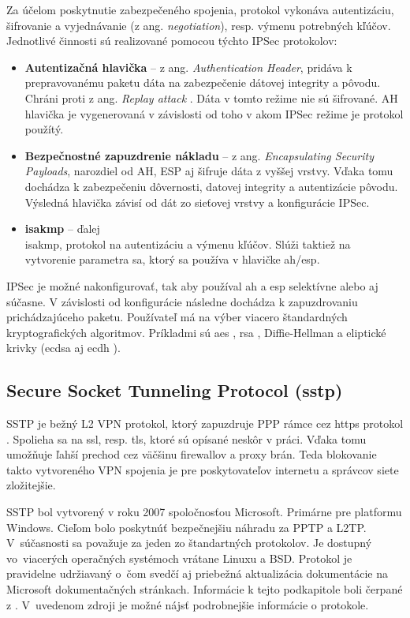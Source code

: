 Za účelom poskytnutie zabezpečeného spojenia, protokol vykonáva autentizáciu, šifrovanie a vyjednávanie (z ang. \textit{negotiation}), resp. výmenu potrebných kľúčov. Jednotlivé činnosti sú realizované pomocou týchto IPSec protokolov:
\begin{itemize}
	\item{\textbf{Autentizačná hlavička}} -- z ang. \textit{Authentication Header}, pridáva k prepravovanému paketu dáta na zabezpečenie dátovej integrity a pôvodu. Chráni proti z ang. \textit{Replay attack} \cite{repa}. Dáta v tomto režime nie sú šifrované. AH hlavička je vygenerovaná v závislosti od toho v akom IPSec režime je protokol použítý.    
	\item{\textbf{Bezpečnostné zapuzdrenie nákladu}} -- z ang. \textit{Encapsulating Security Payloads}, narozdiel od AH, ESP aj šifruje dáta z vyššej vrstvy. Vďaka tomu dochádza k zabezpečeniu dôvernosti, datovej integrity a autentizácie pôvodu. Výsledná hlavička závisí od dát zo sieťovej vrstvy a konfigurácie IPSec.    
	\item{\textbf{\acrlong{isakmp}}} -- ďalej \\\acrshort{isakmp}, protokol na autentizáciu a výmenu kľúčov. Slúži taktiež na vytvorenie parametra \acrshort{sa}, ktorý sa používa v hlavičke \acrshort{ah}/\acrshort{esp}.
\end{itemize}

IPSec je možné nakonfigurovať, tak aby používal \acrshort{ah} a \acrshort{esp} selektívne alebo aj súčasne. V závislosti od konfigurácie následne dochádza k zapuzdrovaniu prichádzajúceho paketu. Používateľ má na výber viacero štandardných kryptografických algoritmov. Príkladmi sú \acrshort{aes} \cite{aes}, \acrshort{rsa} \cite{rsa}, Diffie-Hellman \cite{dh} a  eliptické krivky (\acrshort{ecdsa} \cite{ecdsa} aj \acrshort{ecdh} \cite{ecdh}).

\subsection{Secure Socket Tunneling Protocol (\acrshort{sstp})}
SSTP je bežný L2 VPN protokol, ktorý zapuzdruje PPP rámce cez \acrshort{https} protokol \cite{https}. Spolieha sa na \acrshort{ssl}, resp. \acrshort{tls}, ktoré sú opísané neskôr v práci. Vďaka tomu umožňuje ľahší prechod cez väčšinu firewallov a proxy brán. Teda blokovanie takto vytvoreného VPN spojenia je pre poskytovateľov internetu a správcov siete zložitejšie. 

SSTP bol vytvorený v roku 2007 spoločnosťou Microsoft. Primárne pre platformu Windows. Cieľom bolo poskytnúť bezpečnejšiu náhradu za PPTP a L2TP. V~súčasnosti sa považuje za jeden zo štandartných protokolov. Je dostupný vo~viacerých operačných systémoch vrátane Linuxu a BSD. Protokol je pravidelne udržiavaný o~čom svedčí aj priebežná aktualizácia dokumentácie na Microsoft dokumentačných stránkach. Informácie k tejto podkapitole boli čerpané z \cite{mssstp}. V~uvedenom zdroji je možné nájsť podrobnejšie informácie o protokole. 

